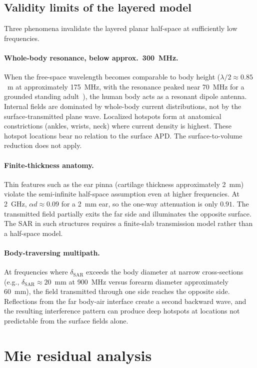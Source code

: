 \documentclass[journal,twocolumn,10pt]{IEEEtran}
\theoremstyle{plain}
\theoremstyle{remark}
\begin{document}
\subsection{Validity limits of the layered model}
Three phenomena invalidate the layered planar half-space at
sufficiently low frequencies.

\paragraph{Whole-body resonance, below approx.\ 300~MHz.}
When the free-space wavelength becomes comparable to body height
($\lambda/2 \approx 0.85$~m at approximately 175~MHz, with the resonance
peaked near 70~MHz for a grounded standing
adult~\cite{Durney1986}), the human body acts as a resonant dipole
antenna. Internal fields are dominated by whole-body current
distributions, not by the surface-transmitted plane wave. Localized
hotspots form at anatomical constrictions (ankles, wrists, neck)
where current density is highest. These hotspot locations bear no
relation to the surface \gls{APD}. The
surface-to-volume reduction does not apply.

\paragraph{Finite-thickness anatomy.}
Thin features such as the ear pinna (cartilage thickness
approximately 2~mm) violate the semi-infinite half-space assumption even
at higher frequencies. At 2~GHz, $\alpha d \approx 0.09$ for a
2~mm ear, so the one-way attenuation is only $0.91$. The
transmitted field partially exits the far side and illuminates the
opposite surface. The SAR in such structures requires a
finite-slab transmission model rather than a half-space model.

\paragraph{Body-traversing multipath.}
At frequencies where $\delta_{\mathrm{SAR}}$ exceeds the body
diameter at narrow cross-sections (e.g., $\delta_{\mathrm{SAR}}
\approx 20$~mm at 900~MHz versus forearm diameter
approximately 60~mm), the field transmitted through one side reaches the
opposite side. Reflections from the far body-air interface create a
second backward wave, and the resulting interference pattern can
produce deep hotspots at locations not predictable from the surface
fields alone.


\section{Mie residual analysis}\label{si:mie}
\end{document}
